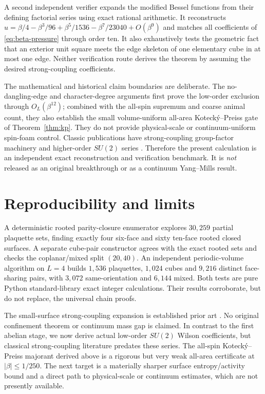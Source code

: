 \documentclass[11pt,a4paper]{article}
\begin{document}
A second independent verifier expands the modified Bessel functions
from their defining factorial series using exact rational arithmetic.
It reconstructs $u=\beta/4-\beta^3/96+\beta^5/1536
-\beta^7/23040+O(\beta^9)$ and matches all coefficients of
\eqref{eq:beta-pressure} through order ten. It also exhaustively tests
the geometric fact that an exterior unit square meets the edge skeleton
of one elementary cube in at most one edge. Neither verification route
derives the theorem by assuming the desired strong-coupling coefficients.

The mathematical and historical claim boundaries are deliberate.
The no-dangling-edge and character-degree arguments first prove
the low-order exclusion through $O_L(\beta^{12})$; combined with the
all-spin supremum and coarse animal count, they also establish the
small volume-uniform all-area Koteck\'y--Preiss gate of
Theorem~\ref{thm:kp}. They do not provide physical-scale or
continuum-uniform spin-foam control. Classic publications have
strong-coupling group-factor machinery and higher-order $SU(2)$
series \cite{drouffe,kogut}. Therefore the present calculation is
an independent exact reconstruction and verification benchmark.
It is \emph{not} released as an original breakthrough or as a
continuum Yang--Mills result.

\section{Reproducibility and limits}
A deterministic rooted parity-closure enumerator explores \(30{,}259\) partial plaquette sets, finding exactly four six-face and sixty ten-face rooted closed surfaces. A separate cube-pair constructor agrees with the exact rooted sets and checks the coplanar/mixed split \((20,40)\). An independent periodic-volume algorithm on \(L=4\) builds \(1{,}536\) plaquettes, \(1{,}024\) cubes and \(9{,}216\) distinct face-sharing pairs, with \(3{,}072\) same-orientation and \(6{,}144\) mixed. Both tests are pure Python standard-library exact integer calculations. Their results corroborate, but do not replace, the universal chain proofs.

The small-surface strong-coupling expansion is established prior art \cite{drouffe,kogut,forsstrom}. No original confinement theorem or continuum mass gap is claimed. In contrast to the first abelian stage, we now derive actual low-order \(SU(2)\) Wilson coefficients, but classical strong-coupling literature predates these series. The all-spin Koteck\'y--Preiss majorant derived above is a rigorous but very weak all-area certificate at $|\beta|\le1/250$. The next target is a materially sharper surface entropy/activity bound and a direct path to physical-scale or continuum estimates, which are not presently available.
\end{document}
